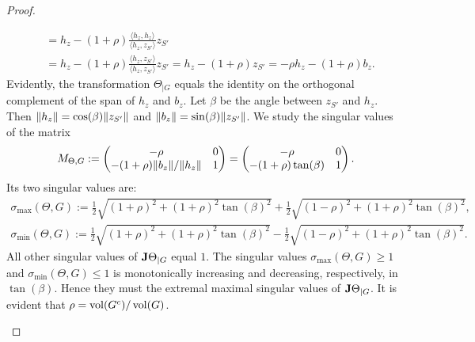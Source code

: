 \documentclass[10pt,a4paper]{article}
\begin{document}
\begin{proof}
\begin{itemize}
\begin{align*}
            &= 
            h_{z}
            - 
            (1+\rho) \frac{\langle h_{z}, h_{z} \rangle}{\langle h_{z}, z_{S'} \rangle} z_{S'}
            \\&
            = 
            h_{z}
            - 
            (1+\rho) \frac{\langle h_{z}, z_{S'} \rangle}{\langle h_{z}, z_{S'} \rangle} z_{S'}
            = 
            h_{z}
            - 
            (1+\rho) z_{S'}
            = 
            - \rho h_{z}
            - 
            (1+\rho) b_{z}
            .
        \end{align*}
        Evidently, the transformation $\Theta_{|G}$ equals the identity on the orthogonal complement of the span of $h_{z}$ and $b_{z}$. 
        Let $\beta$ be the angle between $z_{S'}$ and $h_{z}$. 
        Then $\|  h_{z}  \| = \cos(\beta) \|  z_{S'}  \|$ and $\|  b_{z}  \| = \sin(\beta) \|  z_{S'}  \|$. 
        We study the singular values of the matrix 
        \begin{align*}
            M_{\Theta,G} 
            := 
            \begin{pmatrix}
            -\rho                                         & 0
            \\ 
            -(1+\rho) \|  b_{z}  \|/\|  h_{z}  \| & 1
            \end{pmatrix}
            =
            \begin{pmatrix}
            -\rho                 & 0
            \\ 
            -(1+\rho) \tan(\beta) & 1
            \end{pmatrix}
            .
        \end{align*}
        Its two singular values are:
        \begin{align}
            \sigma_{\max}(\Theta,G) 
            := 
            \frac 1 2 \sqrt{ \left( 1 + \rho \right)^{2} + (1+\rho)^{2} \tan(\beta)^{2} } + \frac 1 2 \sqrt{ \left( 1 - \rho \right)^{2} + (1+\rho)^{2} \tan(\beta)^{2} }
            \label{math:theta_max}
            ,
            \\
            \sigma_{\min}(\Theta,G) 
            := 
            \frac 1 2 \sqrt{ \left( 1 + \rho \right)^{2} + (1+\rho)^{2} \tan(\beta)^{2} } - \frac 1 2 \sqrt{ \left( 1 - \rho \right)^{2} + (1+\rho)^{2} \tan(\beta)^{2} }
            \label{math:theta_min}
            .
        \end{align}
        All other singular values of ${\mathbf{J}}\Theta_{|G}$ equal $1$. 
        The singular values $\sigma_{\max}(\Theta,G) \geq 1$ and $\sigma_{\min}(\Theta,G) \leq 1$ is monotonically increasing and decreasing, respectively, in $\tan(\beta)$. Hence they must the extremal maximal singular values of ${\mathbf{J}}\Theta_{|G}$.
        It is evident that $\rho = \operatorname{vol}(G^{c}) / \operatorname{vol}(G)$. 
        

\end{itemize}
\end{proof}
\end{document}

